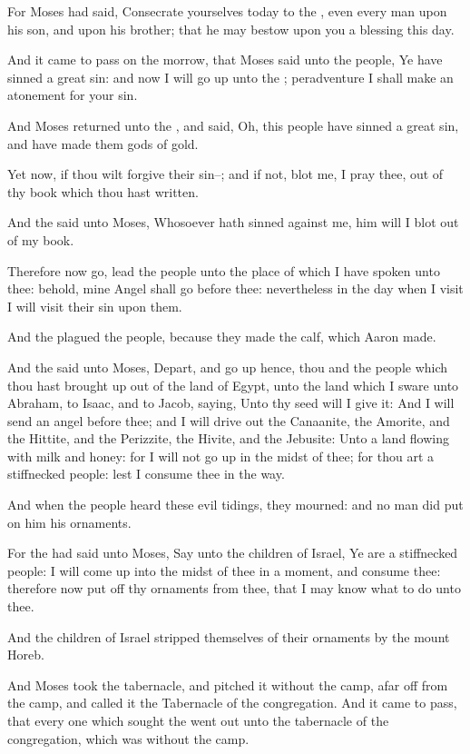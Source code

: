\Verse For Moses had said, Consecrate yourselves today to the \LORD, even every man upon his son, and upon his brother; that he may bestow upon you a blessing this day.

\Verse And it came to pass on the morrow, that Moses said unto the people, Ye have sinned a great sin: and now I will go up unto the \LORD; peradventure I shall make an atonement for your sin.

\Verse And Moses returned unto the \LORD, and said, Oh, this people have sinned a great sin, and have made them gods of gold.

\Verse Yet now, if thou wilt forgive their sin--; and if not, blot me, I pray thee, out of thy book which thou hast written.

\Verse And the \LORD said unto Moses, Whosoever hath sinned against me, him will I blot out of my book.

\Verse Therefore now go, lead the people unto the place of which I have spoken unto thee: behold, mine Angel shall go before thee: nevertheless in the day when I visit I will visit their sin upon them.

\Verse And the \LORD plagued the people, because they made the calf, which Aaron made.

\Chapter
\Verse And the \LORD said unto Moses, Depart, and go up hence, thou and the people which thou hast brought up out of the land of Egypt, unto the land which I sware unto Abraham, to Isaac, and to Jacob, saying, Unto thy seed will I give it: \Verse And I will send an angel before thee; and I will drive out the Canaanite, the Amorite, and the Hittite, and the Perizzite, the Hivite, and the Jebusite: \Verse Unto a land flowing with milk and honey: for I will not go up in the midst of thee; for thou art a stiffnecked people: lest I consume thee in the way.

\Verse And when the people heard these evil tidings, they mourned: and no man did put on him his ornaments.

\Verse For the \LORD had said unto Moses, Say unto the children of Israel, Ye are a stiffnecked people: I will come up into the midst of thee in a moment, and consume thee: therefore now put off thy ornaments from thee, that I may know what to do unto thee.

\Verse And the children of Israel stripped themselves of their ornaments by the mount Horeb.

\Verse And Moses took the tabernacle, and pitched it without the camp, afar off from the camp, and called it the Tabernacle of the congregation. And it came to pass, that every one which sought the \LORD went out unto the tabernacle of the congregation, which was without the camp.

